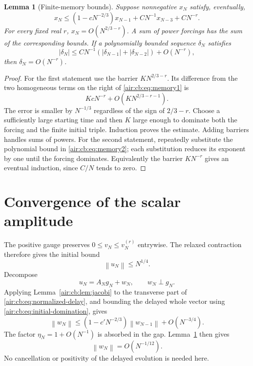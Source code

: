 \documentclass[11pt,letterpaper]{article}
\numberwithin{equation}{section}
\newtheorem{lemma}[theorem]{Lemma}
\theoremstyle{remark}
\newcommand{\norm}[1]{\left\lVert#1\right\rVert}
\begin{document}
\begin{lemma}[Finite-memory bounds]\label{air:cb:lem:memory}
Suppose nonnegative $x_N$ satisfy, eventually,
\begin{equation}\label{air:cb:eq:memory1}
x_N\le(1-cN^{-2/3})x_{N-1}+CN^{-1}x_{N-3}+CN^{-r}.
\end{equation}
For every fixed real $r$, $x_N=O(N^{2/3-r})$. A sum of power forcings has
the sum of the corresponding bounds. If a polynomially bounded sequence
$\delta_N$ satisfies
\begin{equation}\label{air:cb:eq:memory2}
|\delta_N|\le CN^{-1}(|\delta_{N-1}|+|\delta_{N-2}|)+O(N^{-r}),
\end{equation}
then $\delta_N=O(N^{-r})$.
\end{lemma}
\begin{proof}
For the first statement use the barrier $K N^{2/3-r}$. Its difference from
the two homogeneous terms on the right of \eqref{air:cb:eq:memory1} is
\[
KcN^{-r}+O(KN^{2/3-r-1}).
\]
The error is smaller by $N^{-1/3}$ regardless of the sign of $2/3-r$.
Choose a sufficiently large starting time and then $K$ large enough to
dominate both the forcing and the finite initial triple. Induction proves
the estimate. Adding barriers handles sums of powers. For the second
statement, repeatedly substitute the polynomial bound in
\eqref{air:cb:eq:memory2}; each substitution reduces its exponent by one until
the forcing dominates. Equivalently the barrier $KN^{-r}$ gives an
eventual induction, since $C/N$ tends to zero.
\end{proof}

\section{Convergence of the scalar amplitude}

The positive gauge preserves $0\le v_N\le v_N^{(r)}$ entrywise. The relaxed
contraction therefore gives the initial bound
\begin{equation}\label{air:cb:eq:initial-domination}
\norm{u_N}\le N^{1/4}.
\end{equation}
Decompose
\[
u_N=A_Ng_N+w_N,\qquad w_N\perp g_N.
\]
Applying Lemma~\ref{air:cb:lem:jacobi} to the transverse part of
\eqref{air:cb:eq:normalized-delay}, and bounding the delayed whole vector using
\eqref{air:cb:eq:initial-domination}, gives
\[
\norm{w_N}\le(1-c'N^{-2/3})\norm{w_{N-1}}+O(N^{-3/4}).
\]
The factor $\eta_N=1+O(N^{-1})$ is absorbed in the gap. Lemma~\ref{air:cb:lem:memory}
then gives
\begin{equation}\label{air:cb:eq:first-transverse}
\norm{w_N}=O(N^{-1/12}).
\end{equation}
No cancellation or positivity of the delayed evolution is needed here.
\end{document}

